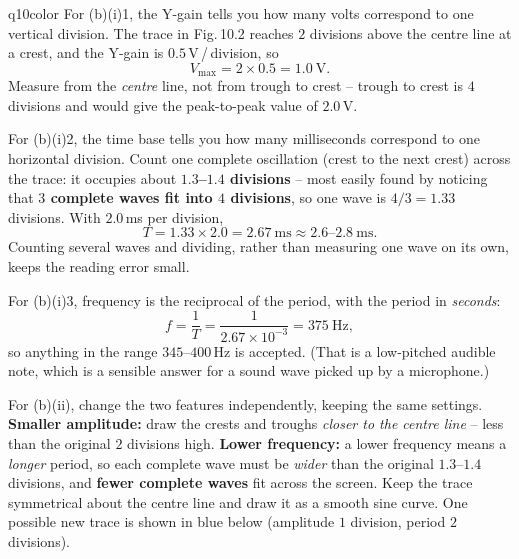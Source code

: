 \documentclass[11pt,a4paper]{article}
\begin{document}
\begin{ansbox}{q10color}
For (b)(i)1, the Y-gain tells you how many volts correspond to one vertical division. The trace in Fig.\,10.2 reaches $2$ divisions above the centre line at a crest, and the Y-gain is $0.5$\,V\,/\,division, so
\[ V_{\max} = 2 \times 0.5 = 1.0\ \mathrm{V}. \]
Measure from the \emph{centre} line, not from trough to crest -- trough to crest is $4$ divisions and would give the peak-to-peak value of $2.0$\,V.

For (b)(i)2, the time base tells you how many milliseconds correspond to one horizontal division. Count one complete oscillation (crest to the next crest) across the trace: it occupies about \textbf{$1.3$--$1.4$ divisions} -- most easily found by noticing that \textbf{$3$ complete waves fit into $4$ divisions}, so one wave is $4/3 = 1.33$ divisions. With $2.0$\,ms per division,
\[ T = 1.33 \times 2.0 = 2.67\ \mathrm{ms} \approx 2.6\text{--}2.8\ \mathrm{ms}. \]
Counting several waves and dividing, rather than measuring one wave on its own, keeps the reading error small.

For (b)(i)3, frequency is the reciprocal of the period, with the period in \emph{seconds}:
\[ f = \frac{1}{T} = \frac{1}{2.67 \times 10^{-3}} = 375\ \mathrm{Hz}, \]
so anything in the range $345$--$400$\,Hz is accepted. (That is a low-pitched audible note, which is a sensible answer for a sound wave picked up by a microphone.)

For (b)(ii), change the two features independently, keeping the same settings. \textbf{Smaller amplitude:} draw the crests and troughs \emph{closer to the centre line} -- less than the original $2$ divisions high. \textbf{Lower frequency:} a lower frequency means a \emph{longer} period, so each complete wave must be \emph{wider} than the original $1.3$--$1.4$ divisions, and \textbf{fewer complete waves} fit across the screen. Keep the trace symmetrical about the centre line and draw it as a smooth sine curve. One possible new trace is shown in blue below (amplitude $1$ division, period $2$ divisions).
\begin{center}
\end{center}
\end{ansbox}
\end{document}
